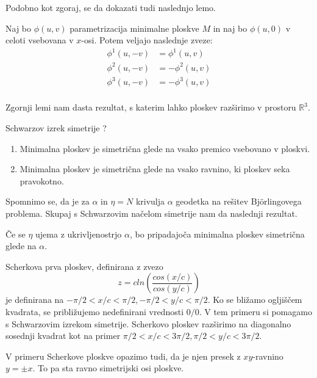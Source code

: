 \documentclass[mat1]{fmfdelo}
\begin{document}
Podobno kot zgoraj, se da dokazati tudi naslednjo lemo.

\begin{lema}
    Naj bo $\phi (u, v)$ parametrizacija minimalne ploskve $M$ in naj bo $\phi (u, 0)$ v celoti vsebovana v $x$-osi.
    Potem veljajo naslednje zveze:
    \begin{align*}
        \phi^{1} (u, - v) &= \phi^{1} (u, v) \\
        \phi^{2} (u, - v) &= - \phi^{2} (u, v) \\
        \phi^{3} (u, - v) &= - \phi^{3} (u, v) \\ 
    \end{align*}
\end{lema}


Zgornji lemi nam dasta rezultat, s katerim lahko ploskev razširimo v prostoru $\mathbb{R}^3$.

\begin{izrek}{Schwarzov izrek simetrije ?}
    \begin{enumerate}
        \item Minimalna ploskev je simetrična glede na vsako premico vsebovano v ploskvi.
        \item Minimalna ploskev je simetrična glede na vsako ravnino, ki ploskev seka pravokotno.
    \end{enumerate}
\end{izrek}

Spomnimo se, da je za $\alpha$ in $\eta = N$ krivulja $\alpha$ geodetka na rešitev Björlingovega problema. 
Skupaj s Schwarzovim načelom simetrije nam da naslednji rezultat.

\begin{posledica}
    Če se $\eta$ ujema z ukrivljenostrjo $\alpha$, bo pripadajoča minimalna ploskev simetrična glede na $\alpha$.
\end{posledica}

\begin{primer}
    Scherkova prva ploskev, definirana z zvezo $$ z = c ln \left( \frac{cos(x/c)}{cos(y/c)} \right) $$
    je definirana na $ -\pi / 2 < x / c < \pi / 2, -\pi / 2 < y / c < \pi / 2$. Ko se bližamo ogljiščem 
    kvadrata, se približujemo nedefinirani vrednosti $0 / 0$.
    V tem primeru si pomagamo s Schwarzovim izrekom simetrije. Scherkovo ploskev razširimo na diagonalno 
    sosednji kvadrat kot na primer $ \pi / 2 < x / c < 3 \pi / 2, \pi / 2 < y / c < 3 \pi / 2$.

    V primeru Scherkove ploskve opazimo tudi, da je njen presek z $xy$-ravnino $y = \pm x$. To pa sta ravno 
    simetrijski osi ploskve.
\end{primer}
\end{document}
